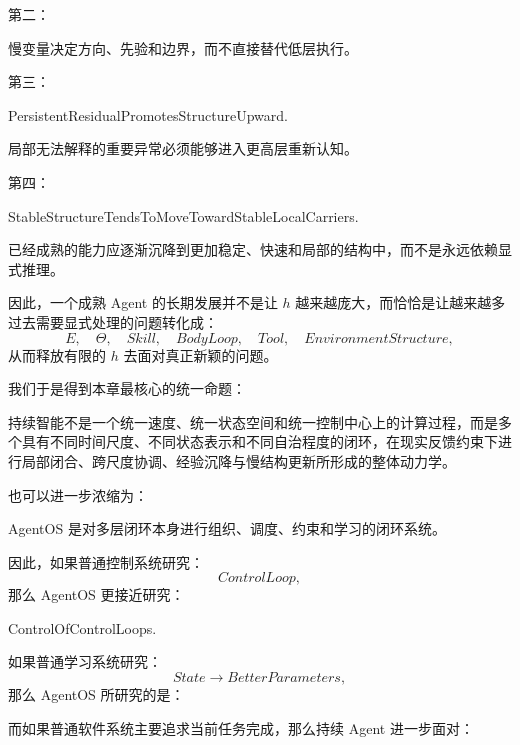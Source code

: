 第二：
\begin{statementbox}
\centering
{}
\end{statementbox}
慢变量决定方向、先验和边界，而不直接替代低层执行。

第三：
\begin{statementbox}
PersistentResidualPromotesStructureUpward.
\end{statementbox}
局部无法解释的重要异常必须能够进入更高层重新认知。

第四：
\begin{statementbox}
StableStructureTendsToMoveTowardStableLocalCarriers.
\end{statementbox}
已经成熟的能力应逐渐沉降到更加稳定、快速和局部的结构中，而不是永远依赖显式推理。

因此，一个成熟 Agent 的长期发展并不是让 $h$ 越来越庞大，而恰恰是让越来越多过去需要显式处理的问题转化成：
\[
E,
\quad
\Theta,
\quad
Skill,
\quad
BodyLoop,
\quad
Tool,
\quad
EnvironmentStructure,
\]
从而释放有限的 $h$ 去面对真正新颖的问题。

我们于是得到本章最核心的统一命题：
\begin{proposition*}
持续智能不是一个统一速度、统一状态空间和统一控制中心上的计算过程，而是多个具有不同时间尺度、不同状态表示和不同自治程度的闭环，在现实反馈约束下进行局部闭合、跨尺度协调、经验沉降与慢结构更新所形成的整体动力学。
\end{proposition*}

也可以进一步浓缩为：
\begin{conclusion}
AgentOS 是对多层闭环本身进行组织、调度、约束和学习的闭环系统。
\end{conclusion}

因此，如果普通控制系统研究：
\[
ControlLoop,
\]
那么 AgentOS 更接近研究：
\begin{statementbox}
ControlOfControlLoops.
\end{statementbox}

如果普通学习系统研究：
\[
State\rightarrow BetterParameters,
\]
那么 AgentOS 所研究的是：
\begin{statementbox}
\centering
{}
\end{statementbox}

而如果普通软件系统主要追求当前任务完成，那么持续 Agent 进一步面对：
\begin{statementbox}
\centering
{}
\end{statementbox}

